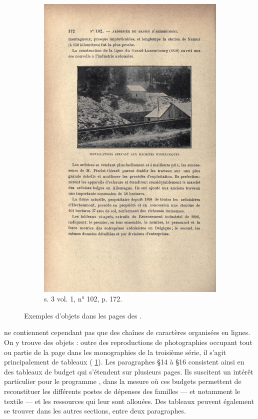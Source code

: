 \begin{figure}
\begin{subfigure}[t]{0.4\textwidth}
     \includegraphics[width=0.8\linewidth]{img/img_s3t1_m102_p172.png}
     \caption{s. 3 vol. 1, n° 102, p. 172.}
    \end{subfigure}
    \hspace{5pt}
    \caption{Exemples d'objets dans les pages des \odm{}.}
    \label{fig:ex_figures}
\end{figure}

\lodm{} ne contiennent cependant pas que des chaînes de caractères organisées en lignes. On y trouve des \og objets \fg{} : outre des reproductions de photographies occupant tout ou partie de la page dans les monographies de la troisième série, il s'agit principalement de tableaux (\fig{} \ref{fig:ex_figures}). Les paragraphes §14 à §16 consistent ainsi en des tableaux de budget qui s'étendent sur plusieurs pages. Ils suscitent un intérêt particulier pour le programme \timeus{}, dans la mesure où ces budgets permettent de reconstituer les différents postes de dépenses des familles --- et notamment le textile --- et les ressources qui leur sont allouées. Des tableaux peuvent également se trouver dans les autres sections, entre deux paragraphes.


